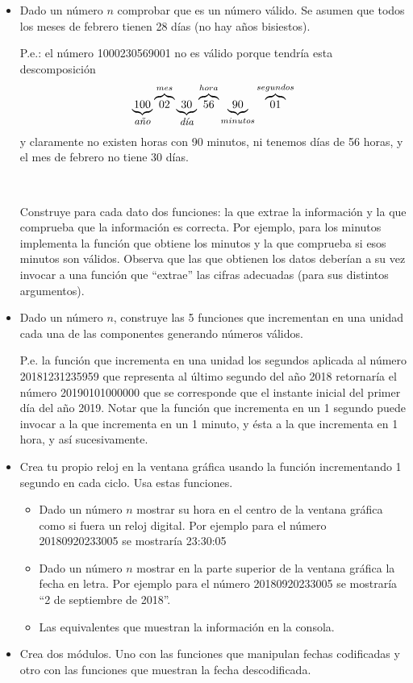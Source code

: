 \begin{itemize}
\item Dado un número $n$ comprobar que es un número válido. Se asumen que todos los meses de febrero tienen 28 días (no hay años bisiestos).

P.e.: el número 1000230569001 no es válido porque tendría esta descomposición
$$
\underbrace{100}_{\mbox{\small \it año}}
\overbrace{02}^{mes}
\underbrace{30}_{\mbox{\small \it día}}
\overbrace{56}^{hora}
\underbrace{90}_{minutos}
\overbrace{01}^{segundos}
$$
y claramente no existen horas con 90 minutos, ni tenemos días de 56 horas, y el mes de febrero no tiene 30 días.

\

Construye para cada dato dos funciones: la que extrae la información y la que comprueba que la información es correcta. 
Por ejemplo, para los minutos implementa la función que obtiene los minutos y la que comprueba si esos minutos son válidos.
Observa que las que obtienen los datos deberían a su vez invocar a una función que ``extrae'' las cifras adecuadas (para sus distintos argumentos).


\item Dado un número $n$, construye las 5 funciones que incrementan en una unidad cada una de las componentes generando números válidos.

P.e. la función que incrementa en una unidad los segundos aplicada al número 20181231235959 que representa al último segundo del año 2018
retornaría el número 20190101000000 que se corresponde que el instante inicial del primer día del año 2019. Notar que la función que
incrementa en un 1 segundo puede invocar a la que incrementa en un 1 minuto, y ésta a la que incrementa en 1 hora, y así sucesivamente.

\item Crea tu propio reloj en la ventana gráfica usando la función  incrementando 1 segundo en cada ciclo. Usa estas funciones.

\begin{itemize}
\item Dado un número $n$ mostrar su hora en el centro de la ventana gráfica como si fuera un reloj digital. Por ejemplo para el número 20180920233005 se mostraría 23:30:05
\item Dado un número $n$ mostrar en la parte superior de la ventana gráfica la fecha en letra. Por ejemplo para el número 20180920233005 se mostraría ``2 de septiembre de 2018''.
\item Las equivalentes que muestran la información en la consola.
\end{itemize}

\item Crea dos módulos. Uno con las funciones que manipulan fechas codificadas y otro con las funciones que muestran la fecha descodificada.
\end{itemize}

